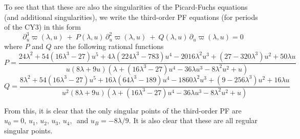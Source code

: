 \documentclass[11pt, a4paper]{article}
\numberwithin{equation}{section}
\begin{document}
To see that that these are also the singularities of the Picard-Fuchs equations (and additional singularities), we write the third-order PF equations (for periods of the CY3) in this form
\begin{equation}
  \partial_u^3 \varpi(\lambda, u) \ + \ P(\lambda, u) \, \partial_u^2 \varpi(\lambda, u) \ + \ Q(\lambda, u) \, \partial_u \varpi(\lambda, u) = 0
\end{equation}
where $P$ and $Q$ are the following rational functions
\begin{equation}
  P = \frac{24 \lambda ^2+54 \left(16 \lambda ^3-27\right) u^5+4 \lambda  \left(224 \lambda ^3-783\right) u^4-2016 \lambda ^2 u^3+\left(27-320 \lambda ^3\right) u^2+50 \lambda  u}{u (8 \lambda +9 u) \left(\lambda +\left(16 \lambda ^3-27\right) u^4-36 \lambda  u^3-8 \lambda ^2 u^2+u\right)}
\end{equation}
\begin{equation}
  Q = \frac{8 \lambda ^2+54 \left(16 \lambda ^3-27\right) u^5+16 \lambda  \left(64 \lambda ^3-189\right) u^4-1860 \lambda ^2 u^3+\left(9-256 \lambda ^3\right) u^2+16 \lambda  u}{u^2 (8 \lambda +9 u) \left(\lambda +\left(16 \lambda ^3-27\right) u^4-36 \lambda  u^3-8 \lambda ^2 u^2+u\right)}
\end{equation}

From this, it is clear that the only singular points of the third-order PF are $u_0 = 0,\, u_1,\, u_2,\, u_3,\, u_4,\,$ and $u_B = -8\lambda/9$. It is also clear that these are all regular singular points.

\printbibliography[title={References}]
\end{document}
